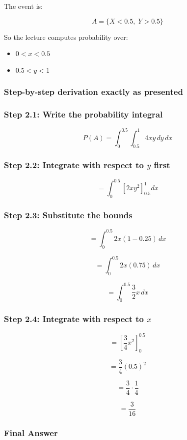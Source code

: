 \documentclass[12pt]{article}
\begin{document}
The event is:

\[
A=\{X<0.5,\;Y>0.5\}
\]

So the lecture computes probability over:

\begin{itemize}
    \item \(0<x<0.5\)
    \item \(0.5<y<1\)
\end{itemize}

\subsubsection*{Step-by-step derivation exactly as presented}

\subsubsection*{Step 2.1: Write the probability integral}

\[
P(A)=\int_0^{0.5}\int_{0.5}^{1}4xy\,dy\,dx
\]

\subsubsection*{Step 2.2: Integrate with respect to \(y\) first}

\[
= \int_0^{0.5}\left[2xy^2\right]_{0.5}^{1}dx
\]

\subsubsection*{Step 2.3: Substitute the bounds}

\[
= \int_0^{0.5}2x(1-0.25)\,dx
\]

\[
= \int_0^{0.5}2x(0.75)\,dx
\]

\[
= \int_0^{0.5}\frac{3}{2}x\,dx
\]

\subsubsection*{Step 2.4: Integrate with respect to \(x\)}

\[
= \left[\frac{3}{4}x^2\right]_0^{0.5}
\]

\[
= \frac{3}{4}(0.5)^2
\]

\[
= \frac{3}{4}\cdot \frac{1}{4}
\]

\[
= \frac{3}{16}
\]

\subsubsection*{Final Answer}
\end{document}

